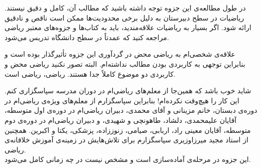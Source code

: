 در طول مطالعه‌ی این جزوه توجه داشته باشید که مطالب آن، کامل و دقیق نیستند. ریاضیات در سطح دبیرستان به دلیل برخی محدودیت‌ها ممکن است ناقص و نادقیق ارائه شود. اگر بسیار به ریاضیات علاقه‌مندید، باید به کتاب‌ها و جزوه‌های معتبر ریاضی مراجعه کنید که عمدتاً در سطح دانشگاه تدریس می‌شود.

علاقه‌ی شخصی‌ام به ریاضی محض در گردآوری این جزوه تأثیرگذار بوده است و بنابراین توجهی به کاربردی بودن مطالب نداشته‌ام. البته تصور نکنید ریاضی محض و کاربردی دو موضوع کاملاً جدا هستند. ریاضی، ریاضی است.

شاید خوب باشد که همین‌جا از معلم‌های ریاضی‌ام در دوران مدرسه سپاسگزاری کنم. این کار را هیچ‌وقت نکرده‌ام! بنابراین سپاسگزارم از معلم‌های ویژه‌ی ریاضی‌ام در دوره‌ی دبستان، خانم مزینانی و آقای محمدی، دبیران ریاضی‌ام در دوره‌ی اول متوسطه، آقایان علیمحمدی، دلشاد، طاهونچی و شهیدی، و دبیران ریاضی‌ام در دوره‌ی دوم متوسطه، آقایان معینی راد، اربابی، صیامی، زنوززاده، پزشکی، یکتا و اکبرین. همچنین از استاد مجید میرزاوزیری سپاسگزارم برای تلاش‌هایش در زمینه‌ی آموزش خلاقانه‌ی ریاضی.
\bigskip
\\
این جزوه در مرحله‌ی آماده‌سازی است و مشخص نیست در چه زمانی کامل می‌شود.
